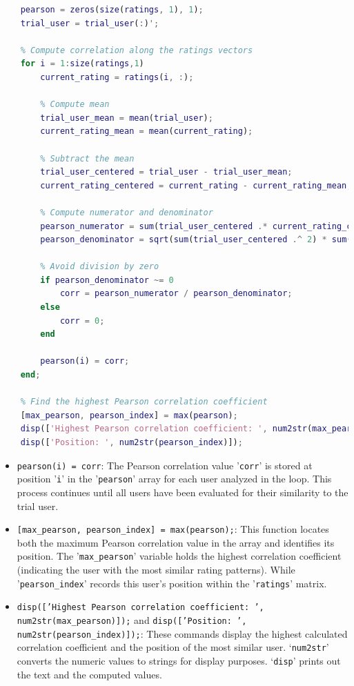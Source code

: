 \begin{lstlisting}[style=StyleCode, language=MATLAB]
	% Compute the Pearson correlation coefficient
	pearson = zeros(size(ratings, 1), 1);
	trial_user = trial_user(:)';
	
	% Compute correlation along the ratings vectors
	for i = 1:size(ratings,1)
		current_rating = ratings(i, :);
		
		% Compute mean 
		trial_user_mean = mean(trial_user);
		current_rating_mean = mean(current_rating);
		
		% Subtract the mean
		trial_user_centered = trial_user - trial_user_mean;
		current_rating_centered = current_rating - current_rating_mean;
		
		% Compute numerator and denominator
		pearson_numerator = sum(trial_user_centered .* current_rating_centered);
		pearson_denominator = sqrt(sum(trial_user_centered .^ 2) * sum(current_rating_centered .^ 2));
		
		% Avoid division by zero
		if pearson_denominator ~= 0
			corr = pearson_numerator / pearson_denominator;
		else
			corr = 0;
		end
		
		pearson(i) = corr;
	end;
	
	% Find the highest Pearson correlation coefficient
	[max_pearson, pearson_index] = max(pearson);
	disp(['Highest Pearson correlation coefficient: ', num2str(max_pearson)]);
	disp(['Position: ', num2str(pearson_index)]);
\end{lstlisting}

\begin{itemize}[label = -]
	\item \texttt{pearson(i) = corr}: The Pearson correlation value '\texttt{corr}' is stored at position '\texttt{i}' in the '\texttt{pearson}' array for each user analyzed in the loop. This process continues until all users have been evaluated for their similarity to the trial user.
	\item \texttt{[max\_pearson, pearson\_index] = max(pearson);}: This function locates both the maximum Pearson correlation value in the array and identifies its position. 
	The '\texttt{max\_pearson}' variable holds the highest correlation coefficient (indicating the user with the most similar rating patterns). While '\texttt{pearson\_index}' records this user's position within the '\texttt{ratings}' matrix.
	\item \texttt{disp(['Highest Pearson correlation coefficient: ', num2str(max\_pearson)]);} and \texttt{disp(['Position: ', num2str(pearson\_index)]);}: These commands display the highest calculated correlation coefficient and the position of the most similar user. ‘\texttt{num2str}’ converts the numeric values to strings for display purposes. ‘\texttt{disp}’ prints out the text and the computed values.
\end{itemize}

